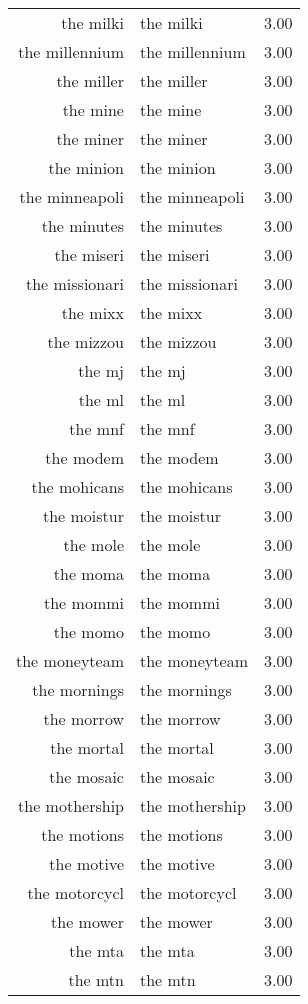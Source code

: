 \begin{table}[ht]
\begin{tabular}{rlr}
  the milki & the milki & 3.00 \\ 
  the millennium & the millennium & 3.00 \\ 
  the miller & the miller & 3.00 \\ 
  the mine & the mine & 3.00 \\ 
  the miner & the miner & 3.00 \\ 
  the minion & the minion & 3.00 \\ 
  the minneapoli & the minneapoli & 3.00 \\ 
  the minutes & the minutes & 3.00 \\ 
  the miseri & the miseri & 3.00 \\ 
  the missionari & the missionari & 3.00 \\ 
  the mixx & the mixx & 3.00 \\ 
  the mizzou & the mizzou & 3.00 \\ 
  the mj & the mj & 3.00 \\ 
  the ml & the ml & 3.00 \\ 
  the mnf & the mnf & 3.00 \\ 
  the modem & the modem & 3.00 \\ 
  the mohicans & the mohicans & 3.00 \\ 
  the moistur & the moistur & 3.00 \\ 
  the mole & the mole & 3.00 \\ 
  the moma & the moma & 3.00 \\ 
  the mommi & the mommi & 3.00 \\ 
  the momo & the momo & 3.00 \\ 
  the moneyteam & the moneyteam & 3.00 \\ 
  the mornings & the mornings & 3.00 \\ 
  the morrow & the morrow & 3.00 \\ 
  the mortal & the mortal & 3.00 \\ 
  the mosaic & the mosaic & 3.00 \\ 
  the mothership & the mothership & 3.00 \\ 
  the motions & the motions & 3.00 \\ 
  the motive & the motive & 3.00 \\ 
  the motorcycl & the motorcycl & 3.00 \\ 
  the mower & the mower & 3.00 \\ 
  the mta & the mta & 3.00 \\ 
  the mtn & the mtn & 3.00 \\ 

\end{tabular}
\end{table}
